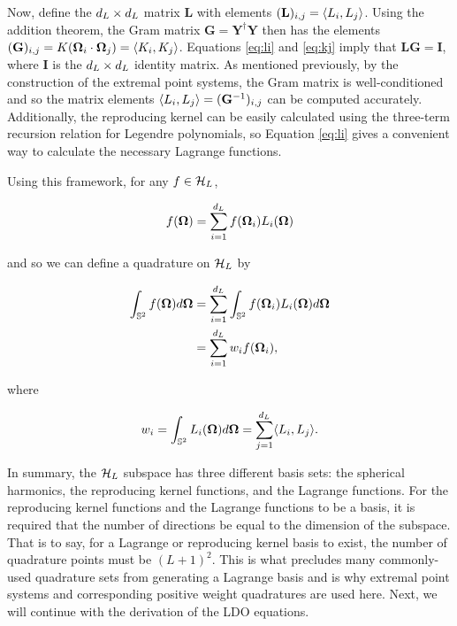 Now, define the $d_L\times d_L$ matrix $\mathbf{L}$ with elements 
$(\mathbf{L})_{i,j} = \langle L_i,L_j \rangle$. Using the addition theorem, the Gram
matrix $\mathbf{G} = \mathbf{Y}^\dagger\mathbf{Y}$ then has the elements 
$(\mathbf{G})_{i,j} = K(\mathbf\Omega_i\cdot\mathbf\Omega_j) = \langle K_i,K_j \rangle$. Equations 
\ref{eq:li} and \ref{eq:kj} imply that $\mathbf{LG} = \mathbf{I}$, where $\mathbf{I}$ 
is the $d_L\times d_L$ identity matrix. As mentioned previously, by the construction of
the extremal point systems, the Gram matrix is well-conditioned and so the matrix 
elements $\langle L_i,L_j \rangle= (\mathbf{G}^{-1})_{i,j}$ can be computed accurately.
Additionally, the reproducing kernel can be easily calculated using the three-term
recursion relation for Legendre polynomials, so Equation \ref{eq:li} gives a 
convenient way to calculate the necessary Lagrange functions.

Using this framework, for any $f \in \mathcal{H}_L$,

\begin{equation}
f(\mathbf\Omega) = \sum_{i=1}^{d_L}f(\mathbf\Omega_i)L_i(\mathbf\Omega)
\end{equation}

\noindent and so we can define a quadrature on $\mathcal{H}_L$ by

\begin{align}
\begin{split}
\int_{\mathbb{S}^2}f(\mathbf\Omega)d\mathbf\Omega&=\sum_{i=1}^{d_L}\int_{\mathbb{S}^2}f(\mathbf\Omega_i)L_i(\mathbf\Omega)d\mathbf\Omega \\
&= \sum_{i=1}^{d_L}w_i f(\mathbf\Omega_i),
\end{split}
\end{align}

\noindent where 

\begin{equation}
w_i = \int_{\mathbb{S}^2}L_i(\mathbf\Omega)d\mathbf\Omega = \sum_{j=1}^{d_L}\langle L_i,L_j \rangle.
\end{equation}

In summary, the $\mathcal{H}_L$ subspace has three different basis sets: the spherical 
harmonics, the reproducing kernel functions, and the Lagrange functions. For the 
reproducing kernel functions and the Lagrange functions to be a basis, it is required 
that the number of directions be equal to the dimension of the subspace. That is to 
say, for a Lagrange or reproducing kernel basis to exist, the number of quadrature 
points must be $(L+1)^2$. This is what precludes many commonly-used quadrature sets 
from generating a Lagrange basis and is why extremal point systems and corresponding 
positive weight quadratures are used here. Next, we will continue with the derivation 
of the LDO equations.

